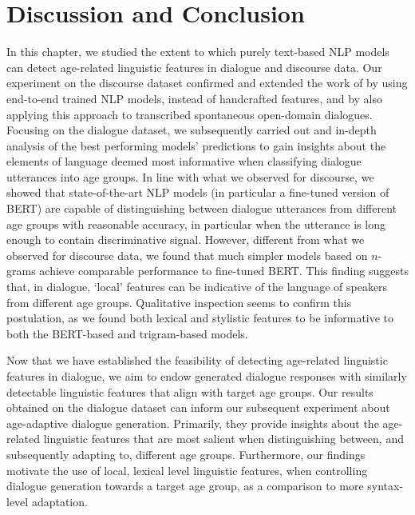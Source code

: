 \section{Discussion and Conclusion}\label{sec:exp1_discussion_conclusion}

In this chapter, we studied the extent to which purely text-based NLP models can detect age-related linguistic features in dialogue and discourse data.
Our experiment on the discourse dataset confirmed and extended the work of \cite{schler2006effects} by using end-to-end trained NLP models, instead of handcrafted features, and by also applying this approach to transcribed spontaneous open-domain dialogues.
Focusing on the dialogue dataset, we subsequently carried out and in-depth analysis of the best performing models' predictions to gain insights about the elements of language deemed most informative when classifying dialogue utterances into age groups.
In line with what we observed for discourse, we showed that state-of-the-art NLP models (in particular a fine-tuned version of BERT) are capable of distinguishing between dialogue utterances from different age groups with reasonable accuracy, in particular when the utterance is long enough to contain discriminative signal.
However, different from what we observed for discourse data, we found that much simpler models based on $n$-grams achieve comparable performance to fine-tuned BERT. 
This finding suggests that, in dialogue, ‘local’ features can be indicative of the language of speakers from different age groups. Qualitative inspection seems to confirm this postulation, as we found both lexical and stylistic features to be informative to both the BERT-based and trigram-based models.

Now that we have established the feasibility of detecting age-related linguistic features in dialogue, we aim to endow generated dialogue responses with similarly detectable linguistic features that align with target age groups. 
Our results obtained on the dialogue dataset can inform our subsequent experiment about age-adaptive dialogue generation. 
Primarily, they provide insights about the age-related linguistic features that are most salient when distinguishing between, and subsequently adapting to, different age groups.
Furthermore, our findings motivate the use of local, lexical level linguistic features, when controlling dialogue generation towards a target age group, as a comparison to more syntax-level adaptation.

